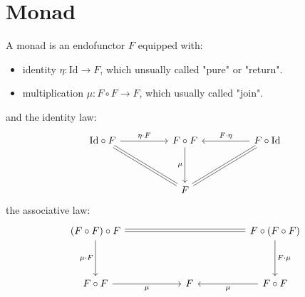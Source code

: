 \documentclass[./main.tex]{subfiles}
\begin{document}
\section{Monad}

A monad is an endofunctor $F$ equipped with:
\begin{itemize}
  \item identity $\eta : \textrm{Id} \rightarrow F$, which unsually called "pure" or "return".
  \item multiplication $\mu : F \circ F \rightarrow F$, which usually called "join".
\end{itemize}
and the identity law:
\[\begin{tikzcd}
	{\mathrm{Id} \circ F} && {F \circ F} && {F \circ \mathrm{Id}} \\
	\\
	{} && F
	\arrow["{\eta \cdot F}", from=1-1, to=1-3]
	\arrow[no head, from=1-1, to=3-3]
	\arrow[shift left, no head, from=1-1, to=3-3]
	\arrow["\mu"', from=1-3, to=3-3]
	\arrow["{F \cdot \eta}"', from=1-5, to=1-3]
	\arrow[no head, from=3-3, to=1-5]
	\arrow[shift left, no head, from=3-3, to=1-5]
\end{tikzcd}\]
the associative law:
\[\begin{tikzcd}
	{(F \circ F) \circ F} &&&& {F \circ (F \circ F)} \\
	\\
	{F \circ F} && F && {F \circ F} \\
	& {}
	\arrow[no head, from=1-1, to=1-5]
	\arrow[shift left, no head, from=1-1, to=1-5]
	\arrow["{\mu \cdot F}"', from=1-1, to=3-1]
	\arrow["{F \cdot \mu}", from=1-5, to=3-5]
	\arrow["\mu"', from=3-1, to=3-3]
	\arrow["\mu", from=3-5, to=3-3]
\end{tikzcd}\]
\end{document}
